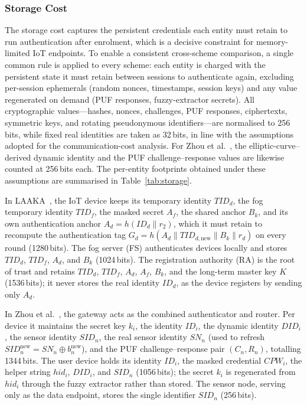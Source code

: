 \documentclass[conference]{IEEEtran}
\begin{document}
\subsubsection{Storage Cost}

The storage cost captures the persistent credentials each entity must retain to
run authentication after enrolment, which is a decisive constraint for
memory-limited IoT endpoints. To enable a consistent cross-scheme comparison, a
single common rule is applied to every scheme: each entity is charged with the
persistent state it must retain between sessions to authenticate again, excluding
per-session ephemerals (random nonces, timestamps, session keys) and any value
regenerated on demand (PUF responses, fuzzy-extractor secrets). All cryptographic
values---hashes, nonces, challenges, PUF responses, ciphertexts, symmetric keys,
and rotating pseudonymous identifiers---are normalised to 256\,bits, while fixed
real identities are taken as 32\,bits, in line with the assumptions adopted for the
communication-cost analysis. For Zhou
et al.~\cite{zhou2024auth}, the elliptic-curve--derived dynamic identity and the
PUF challenge--response values are likewise counted at 256\,bits each. The
per-entity footprints obtained under these assumptions are summarised in
Table~\ref{tab:storage}.

In LAAKA~\cite{ali2024laaka}, the IoT device keeps its temporary identity $TID_d$,
the fog temporary identity $TID_f$, the masked secret $A_f$, the shared anchor
$B_k$, and its own authentication anchor $A_d = h(ID_d \| r_2)$, which it must
retain to recompute the authentication tag
$G_d = h(A_d \| TID_{d,\mathrm{new}} \| B_k \| r_d)$ on every round (1280\,bits).
The fog server (FS) authenticates devices locally and stores $TID_d$, $TID_f$,
$A_d$, and $B_k$ (1024\,bits). The registration authority (RA) is the root of trust
and retains $TID_d$, $TID_f$, $A_d$, $A_f$, $B_k$, and the long-term master key $K$
(1536\,bits); it never stores the real identity $ID_d$, as the device registers by
sending only $A_d$.

In Zhou et al.~\cite{zhou2024auth}, the gateway acts as the combined authenticator
and router. Per device it maintains the secret key $k_i$, the identity $ID_i$, the
dynamic identity $DID_i$, the sensor identity $SID_n$, the real sensor identity
$SN_n$ (used to refresh $SID_n^{\mathrm{new}} = SN_n \oplus b_n^{\mathrm{new}}$),
and the PUF challenge--response pair $(C_n, R_n)$, totalling 1344\,bits. The user
device holds its identity $ID_i$, the masked credential $CPW_i$, the helper string
$hid_i$, $DID_i$, and $SID_n$ (1056\,bits); the secret $k_i$ is regenerated from
$hid_i$ through the fuzzy extractor rather than stored. The sensor node, serving
only as the data endpoint, stores the single identifier $SID_n$ (256\,bits).
\end{document}
